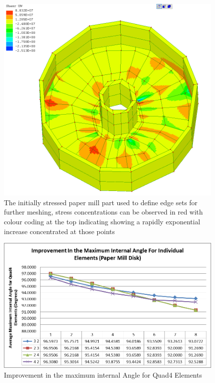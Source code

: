  \begin{figure}[H]
  \centerline{\includegraphics[width=120mm, scale=0.5]{../Graphics/PaperMillStress/PaperMillFirstUWMesh.png}}
  \caption{The initially stressed paper mill part used to define edge sets for further meshing, stress concentrations can be observed in red with colour coding at the top indicating showing a rapidly exponential increase concentrated at those points}
\end{figure}


\begin{figure}[H]
  \centerline{\includegraphics[width=120mm, scale=0.5]{../Graphics/PaperMill/MaximumInternalAngle.png}}
  \caption{Improvement in the maximum internal Angle for Quad4 Elements}
\end{figure}


